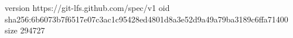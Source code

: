 version https://git-lfs.github.com/spec/v1
oid sha256:6b6073b7f6517e07c3ac1c95428ed4801d8a3e52d9a49a79ba3189c6ffa71400
size 294727

